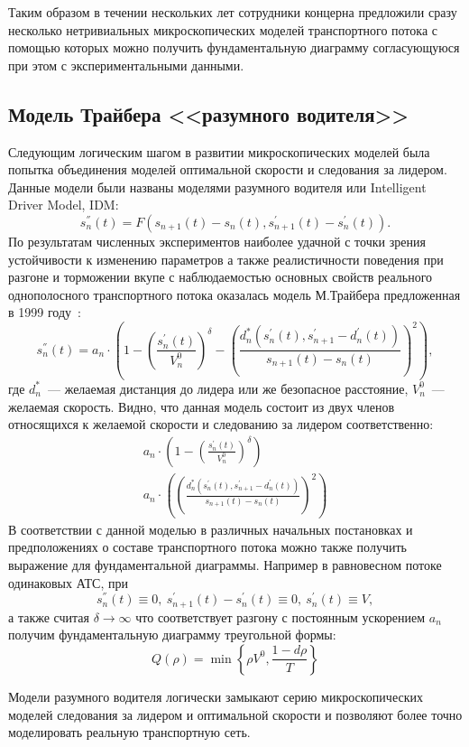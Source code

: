 Таким образом в течении нескольких лет сотрудники концерна предложили сразу несколько нетривиальных микроскопических моделей транспортного потока с помощью которых можно получить фундаментальную диаграмму согласующуюся при этом с экспериментальными данными.


\subsection{Модель Трайбера <<разумного водителя>>}\label{subsec:ch1/sec2/sub3}
Следующим логическим шагом в развитии микроскопических моделей была попытка объединения моделей оптимальной скорости и следования за лидером.
Данные модели были названы моделями разумного водителя или Intelligent Driver Model, IDM:
\[
    s_n^{''}(t) = F(s_{n+1}(t) - s_n(t), s_{n+1}^{'}(t) - s_n^{'}(t)). 
\]
По результатам численных экспериментов наиболее удачной с точки зрения устойчивости к изменению параметров а также реалистичности поведения при разгоне и торможении вкупе с наблюдаемостью основных свойств реального однополосного транспортного потока оказалась модель М.Трайбера предложенная в 1999 году~\cite{treiber1999explanation}:
\[
    s_n^{''}(t) = a_n\cdot \left( 1 - \left( \frac{s_n^{'}(t)}{V_n^0} \right)^{\delta} - \left(\frac{d_n^*(s_n^{'}(t), s_{n+1}^{'} - d_n^{'}(t))}{s_{n+1}(t) - s_n(t)}\right)^2 \right),
\]
где \(d_n^*\)~--- желаемая дистанция до лидера или же безопасное расстояние, \(V_n^0\)~--- желаемая скорость.
Видно, что данная модель состоит из двух членов относящихся к желаемой скорости и следованию за лидером соответственно:
\[
\begin{array}{rl}
    a_n\cdot \left( 1 - \left( \frac{s_n^{'}(t)}{V_n^0} \right)^{\delta}\right) \\
    a_n\cdot \left( \left(\frac{d_n^*(s_n^{'}(t), s_{n+1}^{'} - d_n^{'}(t))}{s_{n+1}(t) - s_n(t)}\right)^2 \right)
\end{array}
\]
В соответствии с данной моделью в различных начальных постановках и предположениях о составе транспортного потока можно также получить выражение для фундаментальной диаграммы.
Например в равновесном потоке одинаковых АТС, при
\[
    s_n^{''}(t) \equiv 0,\ s_{n+1}^{'}(t) - s_n^{'}(t) \equiv 0,\ s_n^{'}(t)\equiv V,
\]
а также считая \(\delta\rightarrow \infty\) что соответствует разгону с постоянным ускорением \(a_n\) получим фундаментальную диаграмму треугольной формы:
\[
    Q(\rho) = \min\left\{\rho V^0, \frac{1-d\rho}{T} \right\}
\]

Модели разумного водителя логически замыкают серию микроскопических моделей следования за лидером и оптимальной скорости и позволяют более точно моделировать реальную транспортную сеть.


